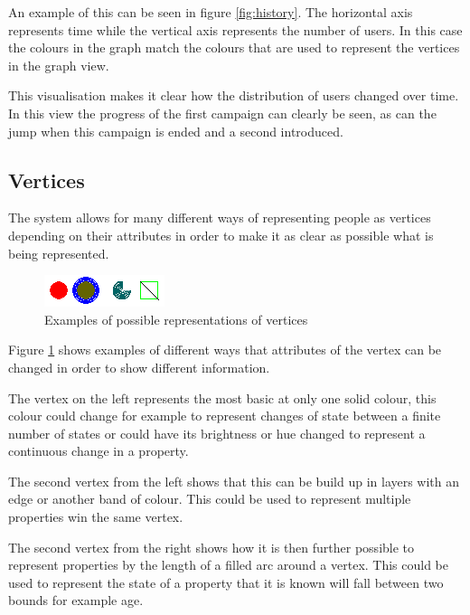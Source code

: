 \documentclass[12pt,a4paper]{article}
\begin{document}
An example of this can be seen in figure \ref{fig:history}. The horizontal axis represents time while the vertical axis represents the number of users. In this case the colours in the graph match the colours that are used to represent the vertices in the graph view.

This visualisation makes it clear how the distribution of users changed over time. In this view the progress of the first campaign can clearly be seen, as can the jump when this campaign is ended and a second introduced.

\subsection{Vertices}

The system allows for many different ways of representing people as vertices depending on their attributes in order to make it as clear as possible what is being represented.

\begin{figure}[htb]
\caption{Examples of possible representations of vertices}
\label{fig:vertices}
\centering
\includegraphics[scale=1]{Nodes.png}
\end{figure}

Figure \ref{fig:vertices} shows examples of different ways that attributes of the vertex can be changed in order to show different information.

The vertex on the left represents the most basic at only one solid colour, this colour could change for example to represent changes of state between a finite number of states or could have its brightness or hue changed to represent a continuous change in a property.

The second vertex from the left shows that this can be build up in layers with an edge or another band of colour. This could be used to represent multiple properties win the same vertex.

The second vertex from the right shows how it is then further possible to represent properties by the length of a filled arc around a vertex. This could be used to represent the state of a property that it is known will fall between two bounds for example age.
\end{document}
